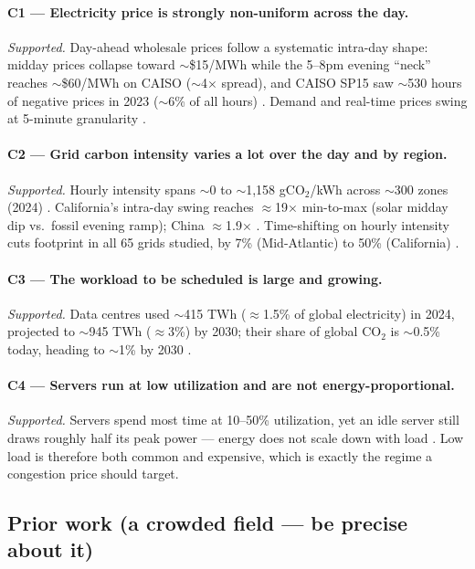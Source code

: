 \documentclass{article}
\begin{document}
\paragraph{C1 --- Electricity price is strongly non-uniform across the day.}
\emph{Supported.} Day-ahead wholesale prices follow a systematic intra-day shape:
midday prices collapse toward $\sim$\$15/MWh while the 5--8pm evening ``neck''
reaches $\sim$\$60/MWh on CAISO ($\sim$4$\times$ spread), and CAISO SP15 saw
$\sim$530 hours of negative prices in 2023 ($\sim$6\% of all hours)
\cite{r1,r2}. Demand and real-time prices swing at 5-minute granularity \cite{r3}.

\paragraph{C2 --- Grid carbon intensity varies a lot over the day and by region.}
\emph{Supported.} Hourly intensity spans $\sim$0 to $\sim$1{,}158 gCO$_2$/kWh across
$\sim$300 zones (2024) \cite{r4}. California's intra-day swing reaches
$\approx$19$\times$ min-to-max (solar midday dip vs.\ fossil evening ramp); China
$\approx$1.9$\times$ \cite{r5}. Time-shifting on hourly intensity cuts footprint in
all 65 grids studied, by 7\% (Mid-Atlantic) to 50\% (California) \cite{r6}.

\paragraph{C3 --- The workload to be scheduled is large and growing.}
\emph{Supported.} Data centres used $\sim$415 TWh ($\approx$1.5\% of global
electricity) in 2024, projected to $\sim$945 TWh ($\approx$3\%) by 2030; their share
of global CO$_2$ is $\sim$0.5\% today, heading to $\sim$1\% by 2030 \cite{r7,r8}.

\paragraph{C4 --- Servers run at low utilization and are not energy-proportional.}
\emph{Supported.} Servers spend most time at 10--50\% utilization, yet an idle server
still draws roughly half its peak power --- energy does not scale down with load
\cite{r9}. Low load is therefore both common and expensive, which is exactly the
regime a congestion price should target.

\subsection*{Prior work (a crowded field --- be precise about it)}
\end{document}
